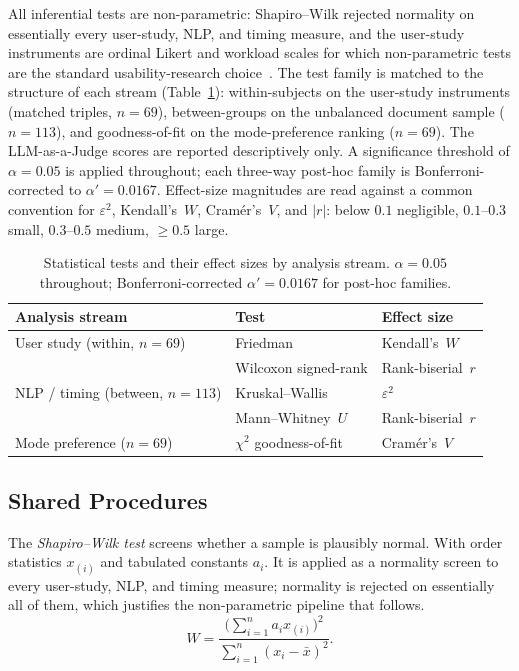 All inferential tests are non-parametric: Shapiro--Wilk rejected normality on essentially every user-study, NLP, and timing measure, and the user-study instruments are ordinal Likert and workload scales for which non-parametric tests are the standard usability-research choice~\cite{SauroLewis2016}. The test family is matched to the structure of each stream (Table~\ref{tab:stat-tests-overview}): within-subjects on the user-study instruments (matched triples, $n = 69$), between-groups on the unbalanced document sample ($n = 113$), and goodness-of-fit on the mode-preference ranking ($n = 69$). The LLM-as-a-Judge scores are reported descriptively only. A significance threshold of $\alpha = 0.05$ is applied throughout; each three-way post-hoc family is Bonferroni-corrected to $\alpha' = 0.0167$. Effect-size magnitudes are read against a common convention for $\varepsilon^2$, Kendall's~$W$, Cram\'{e}r's~$V$, and $|r|$: below $0.1$ negligible, $0.1$--$0.3$ small, $0.3$--$0.5$ medium, $\geq 0.5$ large.

\begin{table}[htbp]
\centering
\begin{tabular}{@{}l l l@{}}
\toprule
Analysis stream & Test & Effect size \\
\midrule
User study (within, $n = 69$)   & Friedman              & Kendall's~$W$ \\
                            & Wilcoxon signed-rank  & Rank-biserial~$r$ \\
NLP / timing (between, $n = 113$) & Kruskal--Wallis & $\varepsilon^2$ \\
                            & Mann--Whitney~$U$     & Rank-biserial~$r$ \\
Mode preference ($n = 69$)  & $\chi^2$ goodness-of-fit & Cram\'{e}r's~$V$ \\
\bottomrule
\end{tabular}
\caption{Statistical tests and their effect sizes by analysis
stream. $\alpha = 0.05$ throughout; Bonferroni-corrected
$\alpha' = 0.0167$ for post-hoc families.}
\label{tab:stat-tests-overview}
\end{table}

\subsection{Shared Procedures}

The \emph{Shapiro--Wilk test} screens whether a sample is plausibly normal. With order statistics $x_{(i)}$ and tabulated constants $a_i$.
It is applied as a normality screen to every user-study, NLP, and timing measure; normality is rejected on essentially all of them, which justifies the non-parametric pipeline that follows.
\begin{equation}
W = \frac{\bigl( \sum_{i=1}^{n} a_i x_{(i)} \bigr)^2}{\sum_{i=1}^{n} (x_i - \bar{x})^2}.
\end{equation}

